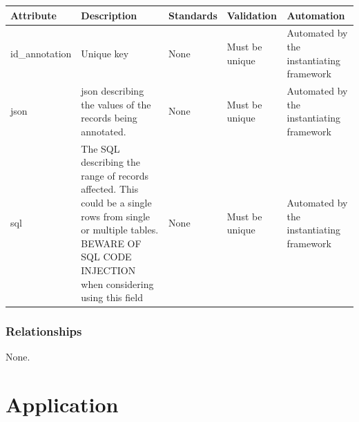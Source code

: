 \documentclass[
]{article}
\newcounter{none} %
\begin{document}
{\def\LTcaptype{none} %
\begin{longtable}[]{@{}
  >{\raggedright\arraybackslash}p{}
  >{\raggedright\arraybackslash}p{}
  >{\raggedright\arraybackslash}p{}
  >{\raggedright\arraybackslash}p{}
  >{\raggedright\arraybackslash}p{}@{}}
\toprule\noalign{}
\begin{minipage}[b]{\linewidth}\raggedright
Attribute
\end{minipage} & \begin{minipage}[b]{\linewidth}\raggedright
Description
\end{minipage} & \begin{minipage}[b]{\linewidth}\raggedright
Standards
\end{minipage} & \begin{minipage}[b]{\linewidth}\raggedright
Validation
\end{minipage} & \begin{minipage}[b]{\linewidth}\raggedright
Automation
\end{minipage} \\
\midrule\noalign{}
\endhead
\bottomrule\noalign{}
\endlastfoot
id\_annotation & Unique key & None & Must be unique & Automated by the
instantiating framework \\
json & json describing the values of the records being annotated. & None
& Must be unique & Automated by the instantiating framework \\
sql & The SQL describing the range of records affected. This could be a
single rows from single or multiple tables. BEWARE OF SQL CODE INJECTION
when considering using this field & None & Must be unique & Automated by
the instantiating framework \\
\end{longtable}
}

\subsubsection{Relationships}\label{relationships}

None.

\section{Application}\label{application}
\end{document}
